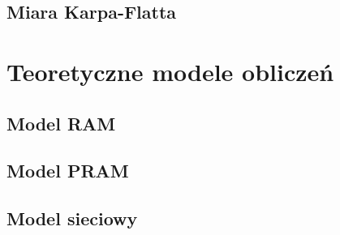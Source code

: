 \subsection{Miara Karpa-Flatta}


\newpage

\section{Teoretyczne modele obliczeń}


\subsection{Model RAM}


\label{subsec:PRAM}
\subsection{Model PRAM}


\subsection{Model sieciowy}

